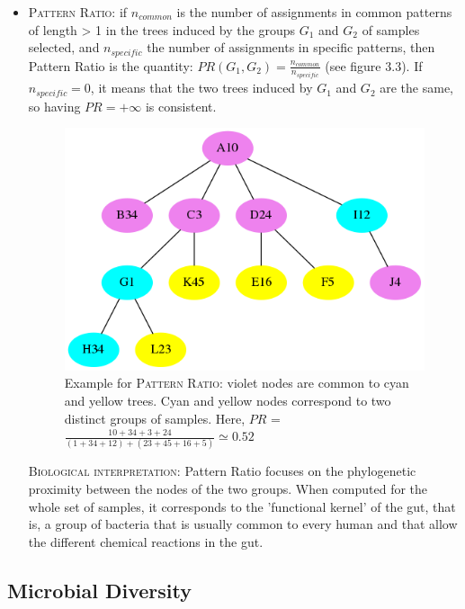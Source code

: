 \documentclass{report}
\begin{document}
\begin{itemize} 
\item \textsc{Pattern Ratio:} if $n_{common}$ is the number of assignments in common patterns of length > 1 in the trees induced by the groups $G_{1}$ and $G_{2}$ of samples selected, and $n_{specific}$ the number of assignments in specific patterns, then Pattern Ratio is the quantity: $PR(G_{1},G_{2}) = \frac{n_{common}}{n_{specific}}$ (see figure $3.3$). If $n_{specific} = 0$, it means that the two trees induced by $G_{1}$ and $G_{2}$ are the same, so having $PR = +\infty$ is consistent.

\begin{figure}[H]
\centering
\includegraphics[scale=0.5]{illustrations/patternratio.png}
\caption{Example for \textsc{Pattern Ratio}: violet nodes are common to cyan and yellow trees. Cyan and yellow nodes correspond to two distinct groups of samples. Here, $PR$ = $\frac{10 + 34 + 3 + 24}{(1 + 34 + 12) + (23 + 45 + 16 + 5)} \simeq 0.52$}
\end{figure}

\bigskip

  \textsc{Biological interpretation:} Pattern Ratio focuses on the phylogenetic proximity between the nodes of the two groups. When computed for the whole set of samples, it corresponds to the 'functional kernel' of the gut, that is, a group of bacteria that is usually common to every human and that allow the different chemical reactions in the gut. 

\end{itemize}

\subsection{Microbial Diversity}
\end{document}
